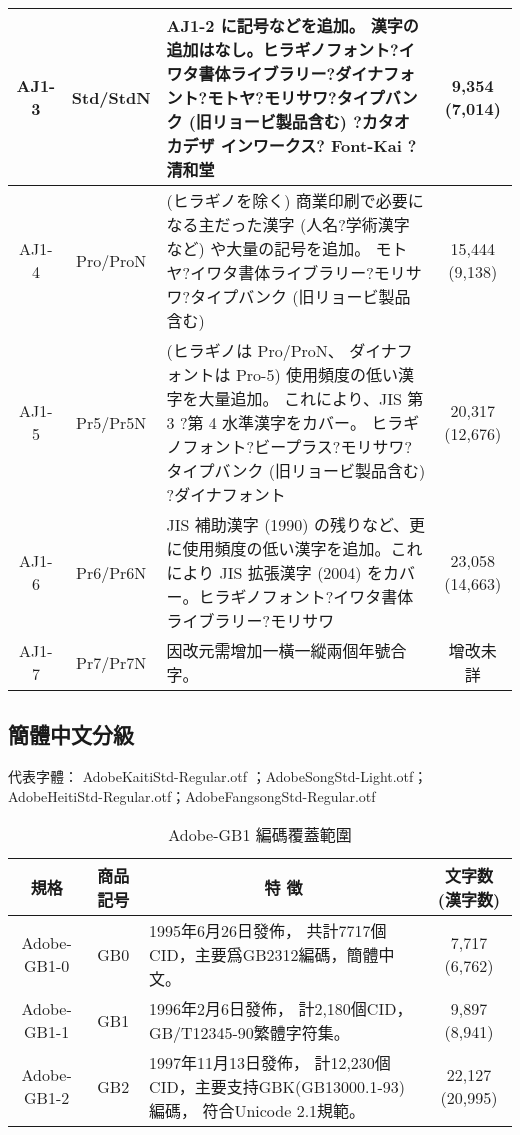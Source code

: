 \documentclass[a4,11pt,uplatex,openleft]{jsarticle}
\begin{document}
\begin{appendix}
\begin{table}[h]
{\begin{tabular}{|c|c|p{6cm}|c|}
AJ1-3	& Std/StdN	&   AJ1-2 に記号などを追加。
漢字の追加はなし。ヒラギノフォント?イワタ書体ライブラリー?ダイナフォ
ント?モトヤ?モリサワ?タイプバンク (旧リョービ製品含む) ?カタオカデザ
インワークス? Font-Kai ?清和堂 & 9,354 (7,014) \\

\hline
AJ1-4	& Pro/ProN &
(ヒラギノを除く)	商業印刷で必要になる主だった漢字
(人名?学術漢字など) や大量の記号を追加。
モトヤ?イワタ書体ライブラリー?モリサワ?タイプバンク
(旧リョービ製品含む)  & 15,444 (9,138) \\
\hline
AJ1-5	& Pr5/Pr5N &
(ヒラギノは Pro/ProN、
ダイナフォントは Pro-5)	使用頻度の低い漢字を大量追加。
これにより、JIS 第 3 ?第 4 水準漢字をカバー。
ヒラギノフォント?ビープラス?モリサワ?タイプバンク
(旧リョービ製品含む) ?ダイナフォント  & 20,317 (12,676) \\

\hline
AJ1-6	& Pr6/Pr6N	&  JIS 補助漢字 (1990)
の残りなど、更に使用頻度の低い漢字を追加。これにより JIS 拡張漢字
(2004) をカバー。ヒラギノフォント?イワタ書体ライブラリー?モリサワ
& 23,058 (14,663) \\

\hline
AJ1-7	& Pr7/Pr7N	&  因改元需增加一橫一縱兩個年號合字。 & 增改未詳 \\

\hline %
\end{tabular}
}
\end{table}

\clearpage
\subsection{簡體中文分級}
{\gtfamily 代表字體： AdobeKaitiStd-Regular.otf ；AdobeSongStd-Light.otf；\\
\qquad \qquad \qquad AdobeHeitiStd-Regular.otf；AdobeFangsongStd-Regular.otf}
\begin{table}[h]
\caption{\fontsize{12pt}{15pt}\selectfont Adobe-GB1 編碼覆蓋範圍} %
\centering %
{\fontsize{10pt}{15}\selectfont\ttfamily
\begin{tabular}{|c|c|p{6cm}|c|}%
\hline  %

規格 & 商品記号	& \multicolumn{1}{|c|}{特 徴} & 文字数(漢字数) \\

\hline  %
Adobe-GB1-0 &	GB0	 & 1995年6月26日發佈，
共計7717個CID，主要爲GB2312編碼，簡體中文。
& 7,717 (6,762) \\
\hline
Adobe-GB1-1	& GB1 &	1996年2月6日發佈，
計2,180個CID，GB/T12345-90繁體字符集。
& 	9,897 (8,941) \\
\hline
Adobe-GB1-2	& GB2	 &  1997年11月13日發佈，
計12,230個CID，主要支持GBK(GB13000.1-93)編碼，
符合Unicode 2.1規範。 & 22,127 (20,995) \\
\hline


\end{tabular}}
\end{table}
\end{appendix}
\end{document}
